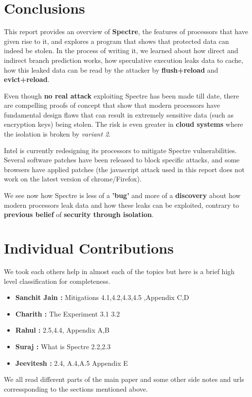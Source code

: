 \documentclass[12pt]{article}
\begin{document}
\section{Conclusions}
This report provides an overview of \textbf{Spectre}, the features of processors that have given rise to it, and explores a program that shows that protected data can indeed be stolen. In the process of writing it, we learned about how direct and indirect branch prediction works, how speculative execution leaks data to cache, how this leaked data can be read by the attacker by \textbf{flush+reload} and \textbf{evict+reload}.

Even though \textbf{no real attack} exploiting Spectre has been made till date, there are compelling proofs of concept that show that modern processors have fundamental design flaws that can result in extremely sensitive data (such as encryption keys) being stolen. The risk is even greater in \textbf{cloud systems} where the isolation is broken by \textit{variant 2}. 

Intel is currently redesigning its processors to mitigate Spectre vulnerabilities. Several software patches have been released to block specific attacks, and some browsers have applied patches (the javascript attack used in this report does not work on the latest version of chrome/Firefox).

We see now how Spectre is less of a \textbf{'bug'} and more of a \textbf{discovery} about how modern processors leak data and how these leaks can be exploited, contrary to \textbf{previous belief} of \textbf{security through isolation}.

\section{Individual Contributions}
We took each others help in almost each of the topics but here is a brief high level classification for completeness.
\begin{itemize}
	\item \textbf{Sanchit Jain : }  Mitigations 4.1,4.2,4.3,4.5 ,Appendix C,D
	\item \textbf{Charith : } The Experiment 3.1 3.2 
	\item \textbf{Rahul : } 2.5,4.4, Appendix A,B
	\item \textbf{Suraj : } What is Spectre 2.2,2.3
	\item \textbf{Jeevitesh : } 2.4, A.4,A.5 Appendix E
\end{itemize}
We all read different parts of the main paper and some other side notes and urls corressponding to the sections mentioned above. 
\end{document}
